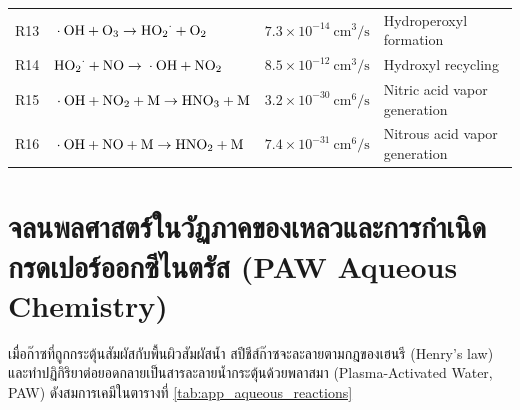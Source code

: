 \begin{table}[H]
\begin{tabularx}{\textwidth}{l l l X}
R13 & $\ce{\cdot OH} + \ce{O3} \to \ce{HO2^{\cdot}} + \ce{O2}$ & $7.3 \times 10^{-14}\ \si{\centi\meter\cubed\per\second}$ & Hydroperoxyl formation \\
R14 & $\ce{HO2^{\cdot}} + \ce{NO} \to \ce{\cdot OH} + \ce{NO2}$ & $8.5 \times 10^{-12}\ \si{\centi\meter\cubed\per\second}$ & Hydroxyl recycling \\
R15 & $\ce{\cdot OH} + \ce{NO2} + \ce{M} \to \ce{HNO3} + \ce{M}$ & $3.2 \times 10^{-30}\ \si{\centi\meter\tothe{6}\per\second}$ & Nitric acid vapor generation \\
R16 & $\ce{\cdot OH} + \ce{NO} + \ce{M} \to \ce{HNO2} + \ce{M}$ & $7.4 \times 10^{-31}\ \si{\centi\meter\tothe{6}\per\second}$ & Nitrous acid vapor generation \\
\bottomrule
\end{tabularx}
\end{table}

\section{จลนพลศาสตร์ในวัฏภาคของเหลวและการกำเนิดกรดเปอร์ออกซีไนตรัส (PAW Aqueous Chemistry)}
\label{app:sec_aqueous_kinetics}

เมื่อก๊าซที่ถูกกระตุ้นสัมผัสกับพื้นผิวสัมผัสน้ำ สปีชีส์ก๊าซจะละลายตามกฎของเฮนรี (Henry's law) และทำปฏิกิริยาต่อยอดกลายเป็นสารละลายน้ำกระตุ้นด้วยพลาสมา (Plasma-Activated Water, PAW) ดังสมการเคมีในตารางที่ \ref{tab:app_aqueous_reactions}

